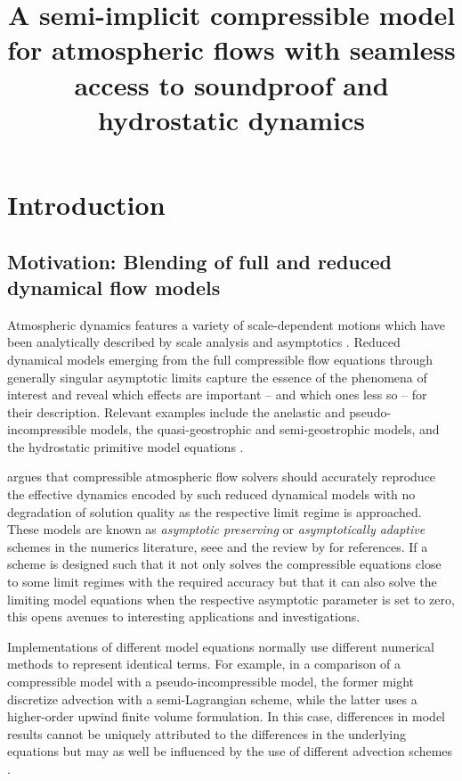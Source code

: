 \documentclass{ametsoc}
\title{A semi-implicit compressible model for atmospheric flows with seamless access to soundproof and hydrostatic dynamics}
\affiliation{MOX - Modelling and Scientific Computing,
Dipartimento di Matematica, Politecnico di Milano, Piazza Leonardo da Vinci 32, 20133 Milano, Italy}
\theoremstyle{definition}
\begin{document}
\maketitle


%
\section{Introduction}
\label{sec:Intro}


\subsection{Motivation: Blending of full and reduced dynamical flow models}

Atmospheric dynamics features a variety of scale-dependent motions which have been analytically described by scale analysis and asymptotics \citep[][]{Pedlosky1992,Klein2010}. Reduced dynamical models emerging from the full compressible flow equations through generally singular asymptotic limits capture the essence of the phenomena of interest and reveal which effects are important -- and which ones less so -- for their description. Relevant examples include the anelastic and pseudo-incompressible models, the quasi-geostrophic and semi-geostrophic models, and the hydrostatic primitive model equations \citep{HoskinsBretherton1972,LippsHemler1982,Durran1989,Pedlosky1992,Bannon1996,CullenMaroofi2003,Klein2010}. 

\citet{Cullen2007} argues that compressible atmospheric flow solvers should accurately reproduce the effective dynamics encoded by such reduced dynamical models with no degradation of solution quality as the respective limit regime is approached. These models are known as \textit{asymptotic preserving} or \textit{asymptotically adaptive} schemes in the numerics literature, seee \citet{KleinEtal2001} and the review by \citet{Jin2012} for references. If a scheme is designed such that it not only solves the compressible equations close to some limit regimes with the required accuracy but that it can also solve the limiting model equations when the respective asymptotic parameter is set to zero, this opens avenues to interesting applications and investigations.

Implementations of different model equations normally use different numerical methods to represent identical terms. For example, in a comparison of a compressible model with a pseudo-incompressible model, the former might discretize advection with a semi-Lagrangian scheme, while the latter uses a higher-order upwind finite volume formulation. In this case, differences in model results cannot be uniquely attributed to the differences in the underlying equations but may as well be influenced by the use of different advection schemes \citep[see][for further examples]{SmolarkiewiczDoernbrack2007,BenacchioEtAl2014}.
\end{document}
